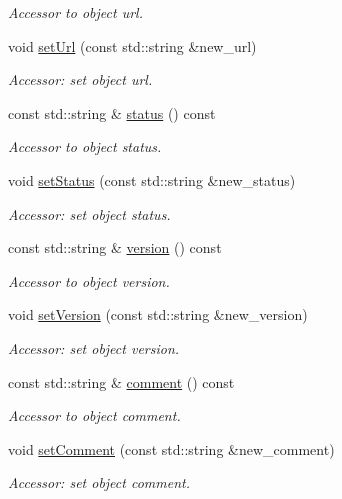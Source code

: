 \begin{DoxyCompactItemize}
\begin{DoxyCompactList}\small\item\em Accessor to object url. \item\end{DoxyCompactList}\item 
void \hyperlink{class_d_d4hep_1_1_geometry_1_1_header_ae7931709b0b3f36f483c4849d5022b38}{setUrl} (const std::string \&new\_\-url)
\begin{DoxyCompactList}\small\item\em Accessor: set object url. \item\end{DoxyCompactList}\item 
const std::string \& \hyperlink{class_d_d4hep_1_1_geometry_1_1_header_a593bf368f3e224f0488fb39f4ca843b6}{status} () const 
\begin{DoxyCompactList}\small\item\em Accessor to object status. \item\end{DoxyCompactList}\item 
void \hyperlink{class_d_d4hep_1_1_geometry_1_1_header_a16e8e70fe306e468d81ff2691612cd6d}{setStatus} (const std::string \&new\_\-status)
\begin{DoxyCompactList}\small\item\em Accessor: set object status. \item\end{DoxyCompactList}\item 
const std::string \& \hyperlink{class_d_d4hep_1_1_geometry_1_1_header_ac514910d5d41e73099a5ee7b9bff0dc1}{version} () const 
\begin{DoxyCompactList}\small\item\em Accessor to object version. \item\end{DoxyCompactList}\item 
void \hyperlink{class_d_d4hep_1_1_geometry_1_1_header_a33ab2e124d5c8f3f2d3f05a50be4bdad}{setVersion} (const std::string \&new\_\-version)
\begin{DoxyCompactList}\small\item\em Accessor: set object version. \item\end{DoxyCompactList}\item 
const std::string \& \hyperlink{class_d_d4hep_1_1_geometry_1_1_header_a9b2886fefe76b723d4de953f871438f5}{comment} () const 
\begin{DoxyCompactList}\small\item\em Accessor to object comment. \item\end{DoxyCompactList}\item 
void \hyperlink{class_d_d4hep_1_1_geometry_1_1_header_afd7df593939068d26d155478d6350481}{setComment} (const std::string \&new\_\-comment)
\begin{DoxyCompactList}\small\item\em Accessor: set object comment. \item\end{DoxyCompactList}\end{DoxyCompactItemize}


